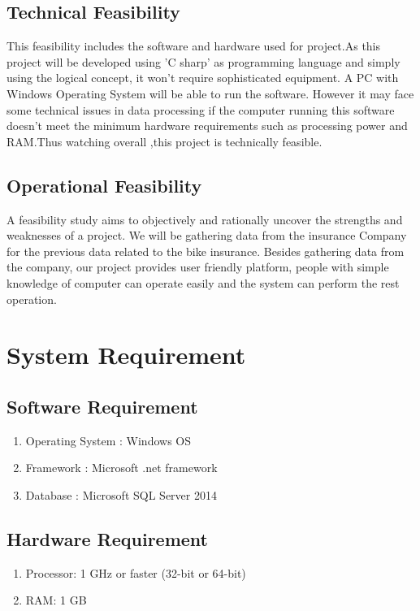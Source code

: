 \subsection{Technical Feasibility}
This feasibility includes the software and hardware used for project.As this project will be developed using 'C sharp' as programming language and simply using the logical concept, it won't require sophisticated equipment. A PC with Windows Operating System will be able to run the software. However it may face some technical issues in data processing if the computer running this software doesn't meet the minimum hardware requirements such as processing power and RAM.Thus watching overall ,this project is technically feasible.

\subsection{Operational Feasibility}
A feasibility study aims to objectively and rationally uncover the strengths and weaknesses of a project.
We will be gathering data from the insurance Company for the previous data related to the bike insurance.    Besides gathering data from the company, our project provides user friendly platform, people with simple knowledge of computer can operate easily and the system can perform the rest operation.


\section{System Requirement}

\subsection{Software Requirement}
\renewcommand{\labelenumi}{\roman*.}
\begin{enumerate}
\item Operating System : Windows OS
\item Framework : Microsoft .net framework
\item Database : Microsoft SQL Server 2014
 
\end{enumerate}

\subsection{Hardware Requirement}
\renewcommand{\labelenumi}{\roman*.}
\begin{enumerate}
\item Processor: 1 GHz or faster (32-bit or 64-bit)
\item RAM: 1 GB
\end{enumerate}

